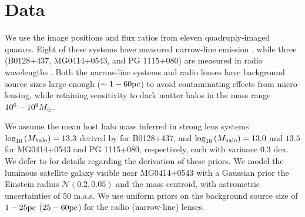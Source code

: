 \section{Data}
\label{sec:data}
We use the image positions and flux ratios from eleven quadruply-imaged quasars. Eight of these systems have measured narrow-line emission \cite{Nierenberg++14,Nierenberg++17,Nierenberg++19}, while three (B0128+437, MG0414+0543, and PG 1115+080) are measured in radio wavelengths \cite{Koopmans++03,Katz++97,Chiba++05}. Both the narrow-line systems and radio lenses have background source sizes large enough ($\sim 1-60 \rm{pc}$) to avoid contaminating effects from micro-lensing, while retaining sensitivity to dark matter halos in the mass range $10^{6}-10^{9} {M_{\odot}}$. 

We assume the mean host halo mass inferred in strong lens systems $\log_{10} \left(M_{\rm{halo}}\right) = 13.3$ derived by \cite{Lagattuta++10} for B0128+437, and $ \log_{10} \left(M_{\rm{halo}}\right) = 13.0$ and $13.5$ for MG0414+0543 and PG 1115+080, respectively, each with variance 0.3 dex. We defer to \cite{Gilman++19b} for details regarding the derivation of these priors. We model the luminous satellite galaxy visible near MG0414+0543 \cite{Ros++00} with a Gaussian prior the Einstein radius $\mathcal{N} \left(0.2, 0.05\right)$ and the mass centroid, with astrometric uncertainties of 50 m.a.s. We use uniform priors on the background source size of $1-25 \rm{pc}$ ($25-60 \rm{pc}$) for the radio (narrow-line) lenses. 


